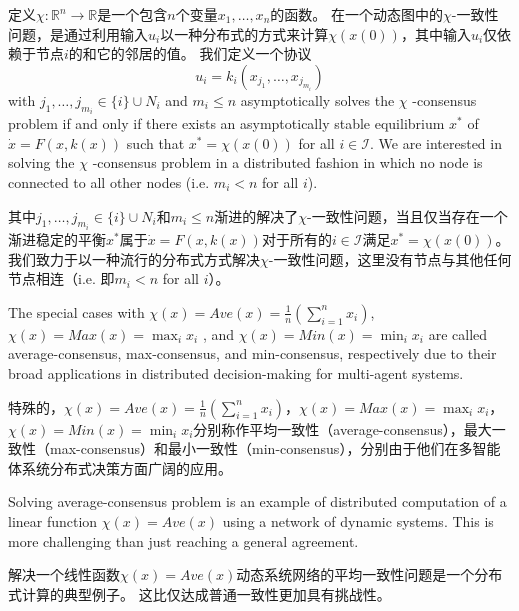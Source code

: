 \documentclass{article}
\begin{document}
定义$\chi: \mathbb{R}^n \rightarrow \mathbb{R}$是一个包含$n$个变量$x_1,\dots,x_n$的函数。
在一个动态图中的$\chi$-一致性问题，是通过利用输入$u_i$以一种分布式的方式来计算$\chi(x(0))$，其中输入$u_i$仅依赖于节点$i$的和它的邻居的值。
我们定义一个协议
\begin{equation}
    u_i = k_i(x_{j_1},\dots,x_{j_{m_i}})
    \tag{3}
    \label{3}
\end{equation}
{\color[gray]{0.5}
\noindent with $j_1,\dots,j_{m_i}\in \{i\} \cup N_i$ and $m_i\leq n$ asymptotically solves the $\chi$ -consensus problem if and only if there exists an asymptotically stable equilibrium $x^*$ of $\dot{x}=F(x,k(x))$ such that $x^*=\chi(x(0))$ for all $i\in \mathcal{I}$. 
We are interested in solving the $\chi$ -consensus problem in a distributed fashion in which {\color{green}no node is connected to all other nodes (i.e. $m_i < n$ for all $i$)}.
}

\noindent 其中$j_1,\dots,j_{m_i}\in \{i\} \cup N_i$和$m_i\leq n$渐进的解决了$\chi$-一致性问题，当且仅当存在一个渐进稳定的平衡$x^*$属于$\dot{x}=F(x,k(x))$对于所有的$i\in \mathcal{I}$满足$x^*=\chi(x(0))$。
我们致力于以一种流行的分布式方式解决$\chi$-一致性问题，这里没有节点与其他任何节点相连（i.e. 即$m_i < n$ for all $i$）。

{\color[gray]{0.5}
The special cases with $\chi(x)=Ave(x)=\frac{1}{n}(\sum_{i=1}^{n}x_i)$, $\chi(x)=Max(x)=\max_ix_i$ , and $\chi(x)=Min(x)=\min_ix_i$ are called average-consensus, max-consensus, and min-consensus, respectively due to their broad applications in distributed decision-making for multi-agent systems.
}

特殊的，$\chi(x)=Ave(x)=\frac{1}{n}(\sum_{i=1}^{n}x_i)$，$\chi(x)=Max(x)=\max_ix_i$，$\chi(x)=Min(x)=\min_ix_i$分别称作平均一致性（average-consensus），最大一致性（max-consensus）和最小一致性（min-consensus），分别由于他们在多智能体系统分布式决策方面广阔的应用。



{\color[gray]{0.5}
Solving average-consensus problem is an example of distributed computation of a linear function $\chi(x)=Ave(x)$ using a network of dynamic systems. 
This is more challenging than just reaching a general agreement.
}

解决一个线性函数$\chi(x)=Ave(x)$动态系统网络的平均一致性问题是一个分布式计算的典型例子。
这比仅达成普通一致性更加具有挑战性。
\end{document}
